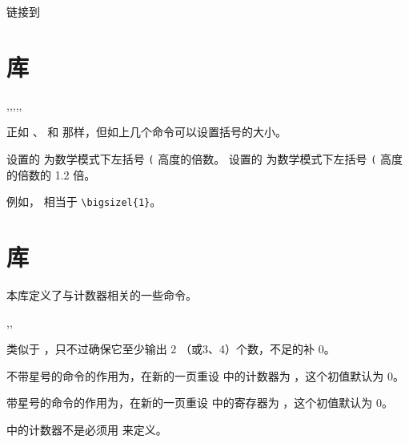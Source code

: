 \documentclass{cusdoc}
\begin{document}
\begin{xample}
\hypersetup{linkcolor=red} 链接到
\stopxamplecode
\label{eg:hyperref-fparbox}
\xampleprint 
\end{xample}

\section{库}

\begin{function}{\delsizel,\delsizem,\delsizer,\bigsizel,\bigsizem,\bigsizer}
  \begin{syntax}
    \V\delsizel {} 
    \V\delsizem {} 
    \V\delsizer {} 
  \end{syntax}
正如 、 和  那样，但如上几个命令可以设置括号的大小。

 设置的  为数学模式下左括号 \texttt{(} 高度的倍数。
 设置的  为数学模式下左括号 \texttt{(} 高度的倍数的 1.2 倍。

例如， 相当于 \verb|\bigsizel{1}|。
\end{function}


\section{库}

本库定义了与计数器相关的一些命令。

\begin{function}[rEXP]{\ensuretwodigits,\ensurethreedigits,\ensurefourdigits}
  \begin{syntax}
    \V\ensuretwodigits {}
  \end{syntax}
类似于 ，只不过确保它至少输出 2 （或3、4）个数，不足的补 0。
\end{function}

\begin{function}{\MakePerPage}
  \begin{syntax}
    \V\MakePerPage                 \!
    \V\MakePerPage   {} 
    \V\MakePerPage *               \!
    \V\MakePerPage *  
  \end{syntax}
不带星号的命令的作用为，在新的一页重设  中的计数器为 
，这个初值默认为 0。

带星号的命令的作用为，在新的一页重设  中的寄存器为
，这个初值默认为 0。

 中的计数器不是必须用  来定义。
\end{function}
\end{document}

